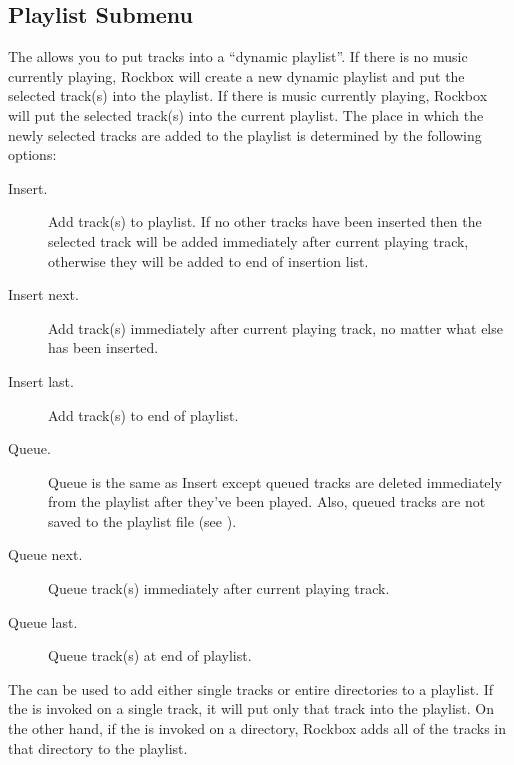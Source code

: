 \subsection{\label{ref:Playlistsubmenu}Playlist Submenu}
The  allows you to put tracks into a ``dynamic
playlist''. If there is no music currently playing, Rockbox will create a
new dynamic playlist and put the selected track(s) into the playlist.
If there is music currently playing, Rockbox will put the selected track(s)
into the current playlist. The place in which
the newly selected tracks are added to the playlist is determined by
the following options:

\begin{description}
\item [Insert.]
  Add track(s) to playlist. If no other tracks have been inserted then the
  selected track will be added immediately after current playing track,
  otherwise they will be added to end of insertion list.
\item [Insert next.]
  Add track(s) immediately after current playing track, no matter what else has
  been inserted.
\item [Insert last.]
  Add track(s) to end of playlist.
\item [Queue.]
  Queue is the same as Insert except queued tracks are deleted immediately from
  the playlist after they've been played. Also, queued tracks are not saved to
  the playlist file (see ).
\item [Queue next.]
  Queue track(s) immediately after current playing track.
\item [Queue last.]
  Queue track(s) at end of playlist.
\end{description}

The  can be used to add either single tracks or
entire directories to a playlist. If the  is
invoked on a single track, it will put only that track into the playlist.
On the other hand, if the  is invoked on a
directory, Rockbox adds all of the tracks in that directory to the playlist.


